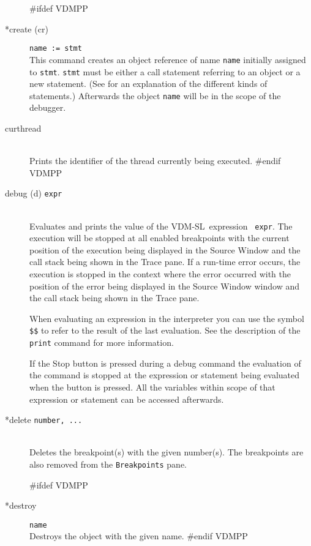 \documentclass[\pformat,12pt]{article}
\newcommand{\vdmslpp}{VDM-SL}
\newcommand{\vdmslpp}{VDM++}
\newcommand{\guicmd}[1]{{\sf #1}}
\newcommand{\guicmd}[1]{{\gt #1}}
\begin{document}
\begin{description}
#ifdef VDMPP
\item[*create (cr)] {\tt name := stmt}\mbox{}\\
  This command creates an object reference of name {\tt name}
  initially assigned to {\tt stmt}.  {\tt stmt} must be either a
  call statement referring to an object or a new statement. (See
  \cite{LangManPP-CSK} for an explanation of the different kinds of
  statements.)  Afterwards the object {\tt name} will be in the scope
  of the debugger.
  
\item[curthread]\mbox{}\\
  Prints the identifier of the thread currently being executed.
#endif VDMPP

\item[debug (d) {\tt expr}]  \mbox{}\\
  Evaluates and prints the value of the \vdmslpp\ expression {\tt
    expr}.  The execution will be stopped at all enabled breakpoints
   with the current position of the execution being
  displayed in the  \guicmd{Source Window} and the call stack being
  shown in the 
  \guicmd{Trace} pane. If a run-time error occurs, the
  execution is stopped in the context where the error occurred
  with the position of the error being displayed in the \guicmd{Source Window}
  window and the call stack being shown in the \guicmd{Trace}
  pane.
  
  When evaluating an expression in the interpreter you can use the 
  symbol {\tt \$\$}\index{\$\$} to refer to the result of the last
  evaluation. See the description of the {\tt print} command for more
  information.
  
  If the \guicmd{Stop} button is pressed during a
  debug 
  command the evaluation of the command is stopped at the expression
  or statement being evaluated when the button is pressed. All the
  variables within scope of that expression or statement can be
  accessed afterwards.
  
\item[*delete {\tt number, ...}] 
\mbox{}\\
  Deletes the breakpoint(s) with the given number(s). The breakpoints
  are also removed from the \texttt{Breakpoints} pane.
  
#ifdef VDMPP
\item[*destroy] {\tt name}\mbox{}\\
  Destroys the object with the given name.
#endif VDMPP


\end{description}
\end{document}
